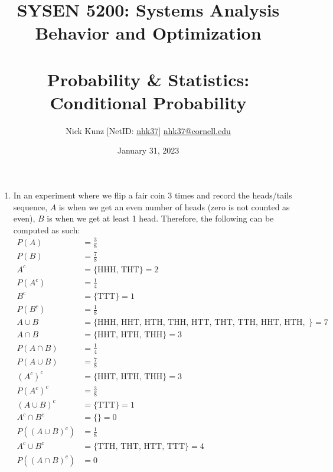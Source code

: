 \documentclass{article}
\begin{document}
\title{SYSEN 5200: Systems Analysis Behavior and Optimization\\~\\
    \Large Probability \& Statistics: Conditional Probability
}
\author{
    Nick Kunz [NetID: \url{nhk37}] \hyperlink{nhk37@cornell.edu}{nhk37@cornell.edu}}
\date{January 31, 2023}
\maketitle
\thispagestyle{fancy}

\begin{enumerate}
    \item In an experiment where we flip a fair coin 3 times and record the heads/tails sequence, $A$ is when we get an even number of heads (zero is not counted as even), $B$ is when we get at least 1 head. Therefore, the following can be computed as such:
    \begin{equation}\nonumber
    \begin{split}
        P(A) &= \frac{3}{8}\\
        P(B) &= \frac{7}{8}\\
        A^{c} &= \{\text{HHH, THT}\} = 2\\
        P(A^{c}) &= \frac{1}{4}\\
        B^{c} &= \{\text{TTT}\} = 1\\
        P(B^{c}) &= \frac{1}{8}\\
        A \cup B &= \{\text{HHH, HHT, HTH, THH, HTT, THT, TTH, HHT, HTH, THH}\} = 7\\
        A \cap B &= \{\text{HHT, HTH, THH}\} = 3\\
        P(A \cap B) &= \frac{1}{4}\\
        P(A \cup B) &= \frac{7}{8}\\
        (A^{c})^{c} &= \{\text{HHT, HTH, THH}\} = 3\\
        P(A^{c})^{c} &= \frac{3}{8}\\
        (A \cup B)^{c} &= \{\text{TTT}\} = 1\\
        A^{c} \cap B^{c} &= \{\text{}\} = 0\\
        P((A \cup B)^{c}) &= \frac{1}{8}\\
        A^{c} \cup B^{c} &= \{\text{TTH, THT, HTT, TTT}\} = 4\\
        P((A \cap B)^{c}) &= 0\\
    \end{split}
    \end{equation}


\end{enumerate}
\end{document}
